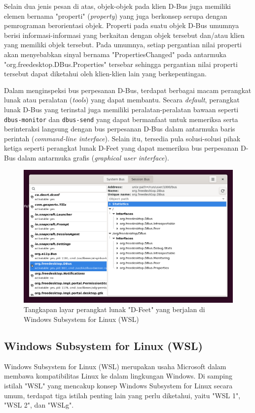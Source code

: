 Selain dua jenis pesan di atas, objek-objek pada klien D-Bus juga memiliki elemen bernama "properti" (\textit{property}) yang juga berkonsep serupa dengan pemrograman berorientasi objek. Properti pada suatu objek D-Bus umumnya berisi informasi-informasi yang berkaitan dengan objek tersebut dan/atau klien yang memiliki objek tersebut. Pada umumnya, setiap pergantian nilai properti akan menyebabkan sinyal bernama "PropertiesChanged" pada antarmuka "org.freedesktop.DBus.Properties" tersebar sehingga pergantian nilai properti tersebut dapat diketahui oleh klien-klien lain yang berkepentingan.

Dalam menginspeksi bus perpesanan D-Bus, terdapat berbagai macam perangkat lunak atau peralatan (\textit{tools}) yang dapat membantu. Secara \textit{default}, perangkat lunak D-Bus yang terinstal juga memiliki peralatan-peralatan bawaan seperti \verb|dbus-monitor| dan \verb|dbus-send| yang dapat bermanfaat untuk memeriksa serta berinteraksi langsung dengan bus perpesanan D-Bus dalam antarmuka baris perintah (\textit{command-line interface}). Selain itu, tersedia pula solusi-solusi pihak ketiga seperti perangkat lunak D-Feet yang dapat memeriksa bus perpesanan D-Bus dalam antarmuka grafis (\textit{graphical user interface}).

\begin{figure}[h]
    \centering
    \includegraphics[width=0.75\linewidth]{assets/dfeet-window-screenshot.png}
    \caption{Tangkapan layar perangkat lunak "D-Feet" yang berjalan di Windows Subsystem for Linux (WSL)}
    \label{fig:enter-label}
\end{figure}

\subsection{Windows Subsystem for Linux (WSL)}

Windows Subsystem for Linux (WSL) merupakan usaha Microsoft dalam membawa kompatibilitas Linux ke dalam lingkungan Windows. Di samping istilah "WSL" yang mencakup konsep Windows Subsystem for Linux secara umum, terdapat tiga istilah penting lain yang perlu diketahui, yaitu "WSL 1", "WSL 2", dan "WSLg".

